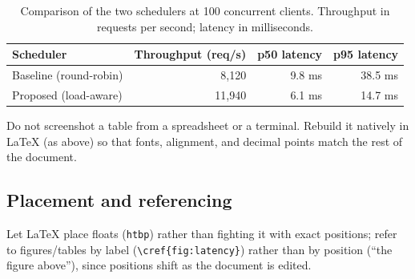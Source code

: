 \begin{table}[htbp]
  \centering
  \caption{Comparison of the two schedulers at 100 concurrent clients.
  Throughput in requests per second; latency in milliseconds.}
  \label{tab:comparison}
  \begin{tabular}{@{}lrrr@{}}
    \toprule
    Scheduler & Throughput (req/s) & p50 latency & p95 latency \\
    \midrule
    Baseline (round-robin) & 8{,}120  & 9.8 ms  & 38.5 ms \\
    Proposed (load-aware)  & 11{,}940 & 6.1 ms  & 14.7 ms \\
    \bottomrule
  \end{tabular}
\end{table}

\begin{pitfallbox}
  Do not screenshot a table from a spreadsheet or a terminal. Rebuild it
  natively in \LaTeX{} (as above) so that fonts, alignment, and decimal
  points match the rest of the document.
\end{pitfallbox}

\subsection{Placement and referencing}
Let \LaTeX{} place floats (\texttt{htbp}) rather than fighting it with
exact positions; refer to figures/tables by label
(\verb|\cref{fig:latency}|) rather than by position (``the figure
above''), since positions shift as the document is edited.
